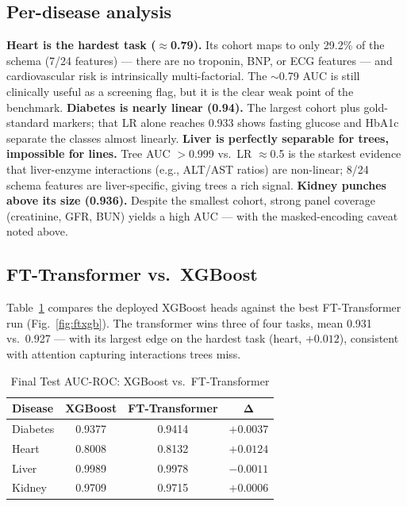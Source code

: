\documentclass[journal]{IEEEtran}
\begin{document}
\subsection{Per-disease analysis}
\textbf{Heart is the hardest task ($\approx$0.79).} Its cohort maps to only 29.2\% of the schema (7/24 features) --- there are no troponin, BNP, or ECG features --- and cardiovascular risk is intrinsically multi-factorial. The $\sim$0.79 AUC is still clinically useful as a screening flag, but it is the clear weak point of the benchmark.
\textbf{Diabetes is nearly linear (0.94).} The largest cohort plus gold-standard markers; that LR alone reaches 0.933 shows fasting glucose and HbA1c separate the classes almost linearly.
\textbf{Liver is perfectly separable for trees, impossible for lines.} Tree AUC $>$0.999 vs.\ LR $\approx$0.5 is the starkest evidence that liver-enzyme interactions (e.g., ALT/AST ratios) are non-linear; 8/24 schema features are liver-specific, giving trees a rich signal.
\textbf{Kidney punches above its size (0.936).} Despite the smallest cohort, strong panel coverage (creatinine, GFR, BUN) yields a high AUC --- with the masked-encoding caveat noted above.

\subsection{FT-Transformer vs.\ XGBoost}
Table~\ref{tab:final} compares the deployed XGBoost heads against the best FT-Transformer run (Fig.~\ref{fig:ftxgb}). The transformer wins three of four tasks, mean 0.931 vs.\ 0.927 --- with its largest edge on the hardest task (heart, $+0.012$), consistent with attention capturing interactions trees miss.

\begin{table}[t]
\centering
\caption{Final Test AUC-ROC: XGBoost vs.\ FT-Transformer}
\label{tab:final}
\small
\begin{tabular}{lccc}
\toprule
\textbf{Disease} & \textbf{XGBoost} & \textbf{FT-Transformer} & $\boldsymbol{\Delta}$ \\
\midrule
Diabetes & 0.9377 & 0.9414 & $+0.0037$ \\
Heart    & 0.8008 & 0.8132 & $+0.0124$ \\
Liver    & 0.9989 & 0.9978 & $-0.0011$ \\
Kidney   & 0.9709 & 0.9715 & $+0.0006$ \\
\bottomrule
\end{tabular}
\end{table}
\end{document}
